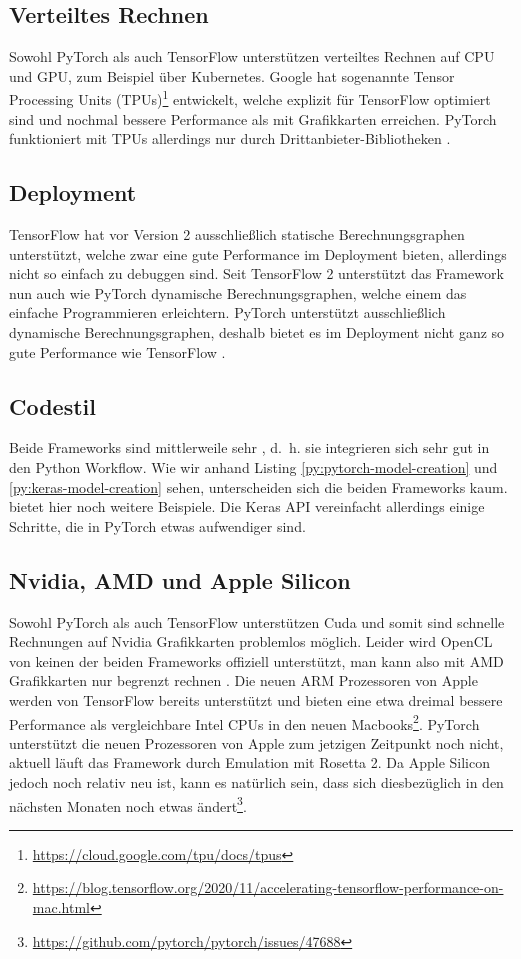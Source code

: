 \subsection{Verteiltes Rechnen}
Sowohl PyTorch als auch TensorFlow unterstützen verteiltes Rechnen auf CPU und GPU, zum Beispiel über Kubernetes. 
Google hat sogenannte Tensor Processing Units (TPUs)\footnote{\url{https://cloud.google.com/tpu/docs/tpus}} entwickelt, 
welche explizit für TensorFlow optimiert sind und nochmal bessere Performance als mit Grafikkarten erreichen. 
PyTorch funktioniert mit TPUs allerdings nur durch Drittanbieter-Bibliotheken \citep{saifee:2020}.

\subsection{Deployment}
TensorFlow hat vor Version 2 ausschließlich statische Berechnungsgraphen unterstützt, welche zwar eine gute Performance im Deployment bieten, 
allerdings nicht so einfach zu debuggen sind. Seit TensorFlow 2 unterstützt das Framework nun auch wie PyTorch dynamische Berechnungsgraphen, 
welche einem das einfache Programmieren erleichtern. PyTorch unterstützt ausschließlich dynamische Berechnungsgraphen, deshalb bietet es im 
Deployment nicht ganz so gute Performance wie TensorFlow \citep{dash:2020}.

\subsection{Codestil}
Beide Frameworks sind mittlerweile sehr , d.~h. sie integrieren sich sehr gut in den Python Workflow. 
Wie wir anhand Listing \ref{py:pytorch-model-creation} und \ref{py:keras-model-creation} sehen, unterscheiden sich die beiden Frameworks kaum. 
\cite{saifee:2020} bietet hier noch weitere Beispiele.
Die Keras API vereinfacht allerdings einige Schritte, die in PyTorch etwas aufwendiger sind. 

\subsection{Nvidia, AMD und Apple Silicon}
Sowohl PyTorch als auch TensorFlow unterstützen Cuda und somit sind schnelle Rechnungen auf Nvidia Grafikkarten problemlos möglich. 
Leider wird OpenCL von keinen der beiden Frameworks offiziell unterstützt, man kann also mit AMD Grafikkarten nur begrenzt rechnen \citep{dimolarov:2019}.
Die neuen ARM Prozessoren von Apple werden von TensorFlow bereits unterstützt und bieten eine etwa dreimal bessere Performance als 
vergleichbare Intel CPUs in den neuen Macbooks\footnote{\url{https://blog.tensorflow.org/2020/11/accelerating-tensorflow-performance-on-mac.html}}.
PyTorch unterstützt die neuen Prozessoren von Apple zum jetzigen Zeitpunkt noch nicht, aktuell läuft das Framework durch Emulation mit Rosetta 2.
Da Apple Silicon jedoch noch relativ neu ist, kann es natürlich sein, dass sich diesbezüglich in den nächsten Monaten noch etwas ändert\footnote{\url{https://github.com/pytorch/pytorch/issues/47688}}.

